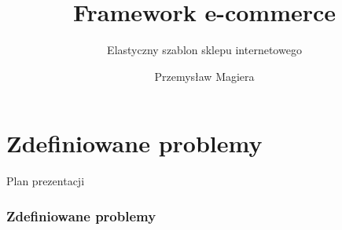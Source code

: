 \documentclass[polish,xcolor=table,9pt,aspectratio=1610,hyperref={pdfpagemode=FullScreen}]{beamer}
\title{Framework e-commerce}
\subtitle{Elastyczny szablon sklepu internetowego}
\author{Przemysław Magiera}
\begin{document}
\frame{\titlepage}

\part{Zdefiniowane problemy} %
\begin{frame}{Plan prezentacji}
\tableofcontents
\end{frame}

\section{Zdefiniowane problemy}
%
\end{document}
